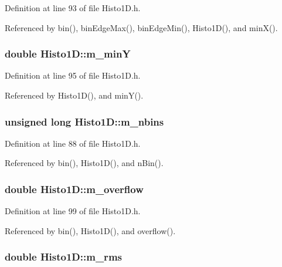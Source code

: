 Definition at line 93 of file Histo1D.h.

Referenced by bin(), binEdgeMax(), binEdgeMin(), Histo1D(), and minX().\hypertarget{classHisto1D_a3bb6c3ea23a1af14ebb10af807f3810d}{
\subsubsection[{m\_\-minY}]{\setlength{\rightskip}{0pt plus 5cm}double {\bf Histo1D::m\_\-minY}}}
\label{classHisto1D_a3bb6c3ea23a1af14ebb10af807f3810d}


Definition at line 95 of file Histo1D.h.

Referenced by Histo1D(), and minY().\hypertarget{classHisto1D_a1913aca9a278b4bfd365f35b85e65d8d}{
\subsubsection[{m\_\-nbins}]{\setlength{\rightskip}{0pt plus 5cm}unsigned long {\bf Histo1D::m\_\-nbins}}}
\label{classHisto1D_a1913aca9a278b4bfd365f35b85e65d8d}


Definition at line 88 of file Histo1D.h.

Referenced by bin(), Histo1D(), and nBin().\hypertarget{classHisto1D_ab60b2ec4e435a3094b7ec218404aa16f}{
\subsubsection[{m\_\-overflow}]{\setlength{\rightskip}{0pt plus 5cm}double {\bf Histo1D::m\_\-overflow}}}
\label{classHisto1D_ab60b2ec4e435a3094b7ec218404aa16f}


Definition at line 99 of file Histo1D.h.

Referenced by bin(), Histo1D(), and overflow().\hypertarget{classHisto1D_a1331c670df40eb18d8a814f5a15ec7da}{
\subsubsection[{m\_\-rms}]{\setlength{\rightskip}{0pt plus 5cm}double {\bf Histo1D::m\_\-rms}}}
\label{classHisto1D_a1331c670df40eb18d8a814f5a15ec7da}


